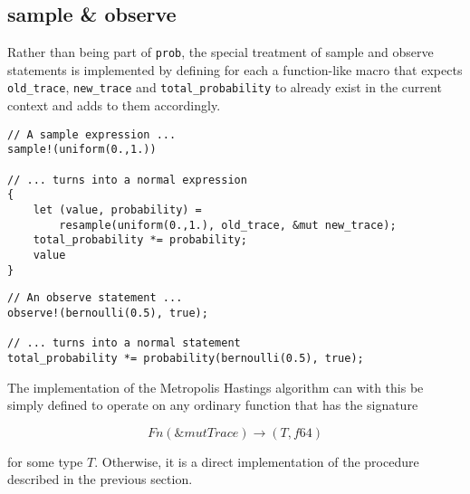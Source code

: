\subsection{sample \& observe}

Rather than being part of \lstinline{prob}, the special treatment of sample and observe statements is implemented by defining for each a function-like macro that expects \lstinline{old_trace}, \lstinline{new_trace} and \lstinline{total_probability} to already exist in the current context and adds to them accordingly.

\begin{minipage}{\linewidth}
\begin{lstlisting}
// A sample expression ...
sample!(uniform(0.,1.))

// ... turns into a normal expression
{
    let (value, probability) =
        resample(uniform(0.,1.), old_trace, &mut new_trace);
    total_probability *= probability;
    value
}
\end{lstlisting}
\end{minipage}

\begin{minipage}{\linewidth}
\begin{lstlisting}
// An observe statement ...
observe!(bernoulli(0.5), true);

// ... turns into a normal statement
total_probability *= probability(bernoulli(0.5), true);
\end{lstlisting}
\end{minipage}

The implementation of the Metropolis Hastings algorithm can with this be simply defined to operate on any ordinary function that has the signature

\begin{equation*}
    Fn(\&mut Trace) \rightarrow (T, f64)
\end{equation*}

for some type $T$. Otherwise, it is a direct implementation of the procedure described in the previous section.
